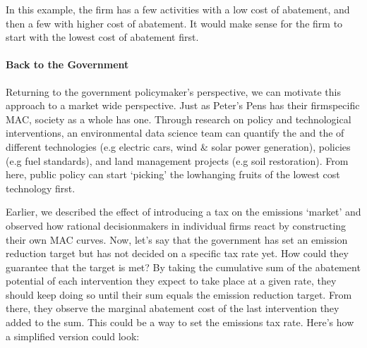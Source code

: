 \documentclass[letterpaper,10pt,english]{jupyterBook}
\begin{document}
\sphinxAtStartPar
{}

\sphinxAtStartPar
In this example, the firm has a few activities with a low cost of abatement, and then a few with higher cost of abatement. It would make sense for the firm to start with the lowest cost of abatement first.


\paragraph{Back to the Government}
\label{\detokenize{content/12-environmental/textbook1:back-to-the-government}}
\sphinxAtStartPar
Returning to the government policymaker’s perspective, we can motivate this approach to a market wide perspective. Just as Peter’s Pens has their firm\sphinxhyphen{}specific MAC, society as a whole has one. Through research on policy and technological interventions, an environmental data science team can quantify the  and the  of different technologies (e.g electric cars, wind \& solar power generation), policies (e.g fuel standards), and land management projects (e.g  soil restoration). From here, public policy can start  ‘picking’ the low\sphinxhyphen{}hanging fruits of the lowest cost technology first.

\sphinxAtStartPar
Earlier, we described the effect of introducing a tax on the emissions ‘market’ and observed how rational decision\sphinxhyphen{}makers in individual firms react by constructing their own MAC curves. Now, let’s say that the government has set an emission reduction target but has not decided on a specific tax rate yet. How could they guarantee that the target is met? By taking the cumulative sum of the abatement potential of each intervention they expect to take place at a given rate, they should keep doing so until their sum equals the emission reduction target. From there, they observe the marginal abatement cost of the last intervention they added to the sum. This could be a way to set the emissions tax rate. Here’s how a simplified version could look:

\sphinxAtStartPar
{}
\end{document}
